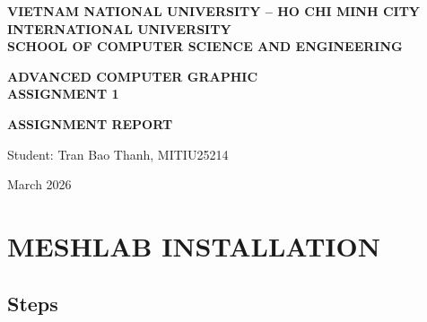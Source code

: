 \documentclass[12pt]{extreport}
\begin{document}
\begin{titlepage}
    \centering
    \vspace*{1cm}
    \textbf{VIETNAM NATIONAL UNIVERSITY -- HO CHI MINH CITY}\\
    \textbf{INTERNATIONAL UNIVERSITY}\\
    \textbf{SCHOOL OF COMPUTER SCIENCE AND ENGINEERING}

    \vspace{3cm}
    \textbf{ADVANCED COMPUTER GRAPHIC}\\
    \textbf{ASSIGNMENT 1}

    \vspace{4cm}
    \textbf{ASSIGNMENT REPORT}

    \vspace{3cm}
    \begin{flushleft}
    \hspace{4cm} Student: Tran Bao Thanh, MITIU25214 \\
    \end{flushleft}

    \vfill
    March 2026
\end{titlepage}

\setcounter{page}{2}
\tableofcontents
\newpage

\chapter{MESHLAB INSTALLATION}

\section{Steps}
\end{document}
